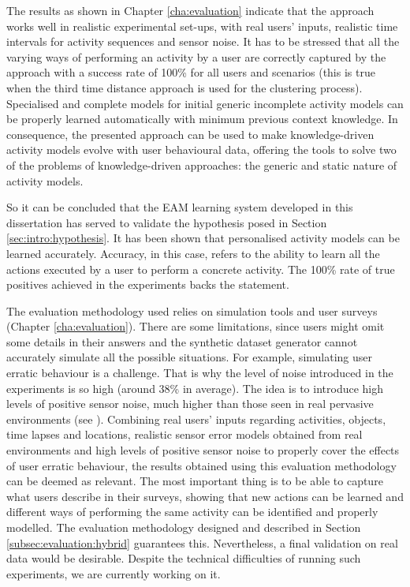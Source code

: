 The results as shown in Chapter \ref{cha:evaluation} indicate that the approach works well in realistic experimental set-ups, with real users' inputs, realistic time intervals for activity sequences and sensor noise. It has to be stressed that all the varying ways of performing an activity by a user are correctly captured by the approach with a success rate of 100\% for all users and scenarios (this is true when the third time distance approach is used for the clustering process). Specialised and complete models for initial generic incomplete activity models can be properly learned automatically with minimum previous context knowledge. In consequence, the presented approach can be used to make knowledge-driven activity models evolve with user behavioural data, offering the tools to solve two of the problems of knowledge-driven approaches: the generic and static nature of activity models.

So it can be concluded that the EAM learning system developed in this dissertation has served to validate the hypothesis posed in Section \ref{sec:intro:hypothesis}. It has been shown that personalised activity models can be learned accurately. Accuracy, in this case, refers to the ability to learn all the actions executed by a user to perform a concrete activity. The 100\% rate of true positives achieved in the experiments backs the statement.

The evaluation methodology used relies on simulation tools and user surveys (Chapter \ref{cha:evaluation}). There are some limitations, since users might omit some details in their answers and the synthetic dataset generator cannot accurately simulate all the possible situations. For example, simulating user erratic behaviour is a challenge. That is why the level of noise introduced in the experiments is so high (around 38\% in average). The idea is to introduce high levels of positive sensor noise, much higher than those seen in real pervasive environments (see \cite{Chen2012}). Combining real users' inputs regarding activities, objects, time lapses and locations, realistic sensor error models obtained from real environments and high levels of positive sensor noise to properly cover the effects of user erratic behaviour, the results obtained using this evaluation methodology can be deemed as relevant. The most important thing is to be able to capture what users describe in their surveys, showing that new actions can be learned and different ways of performing the same activity can be identified and properly modelled. The evaluation methodology designed and described in Section \ref{subsec:evaluation:hybrid} guarantees this. Nevertheless, a final validation on real data would be desirable. Despite the technical difficulties of running such experiments, we are currently working on it.

